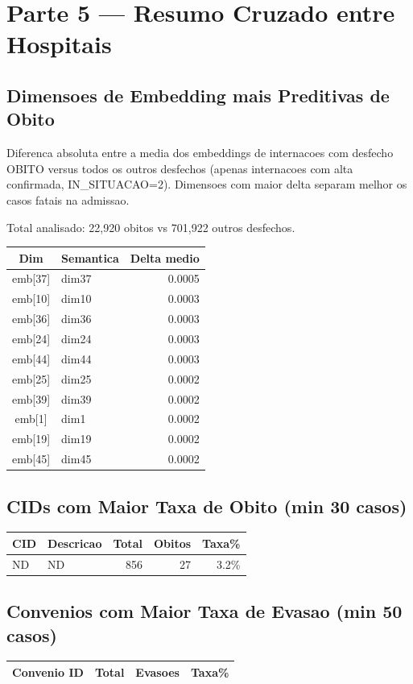 \documentclass[11pt,a4paper]{article}
\begin{document}
\section{Parte 5 --- Resumo Cruzado entre Hospitais}
\subsection{Dimensoes de Embedding mais Preditivas de Obito}
Diferenca absoluta entre a media dos embeddings de internacoes com desfecho OBITO versus todos os outros desfechos (apenas internacoes com alta confirmada, IN\_SITUACAO=2). Dimensoes com maior delta separam melhor os casos fatais na admissao.

Total analisado: 22,920 obitos vs 701,922 outros desfechos.

\begin{tabular}{clr}
\toprule
Dim & Semantica & Delta medio \\
\midrule
emb[37] & dim37 & 0.0005 \\
emb[10] & dim10 & 0.0003 \\
emb[36] & dim36 & 0.0003 \\
emb[24] & dim24 & 0.0003 \\
emb[44] & dim44 & 0.0003 \\
emb[25] & dim25 & 0.0002 \\
emb[39] & dim39 & 0.0002 \\
emb[1] & dim1 & 0.0002 \\
emb[19] & dim19 & 0.0002 \\
emb[45] & dim45 & 0.0002 \\
\bottomrule
\end{tabular}

\subsection{CIDs com Maior Taxa de Obito (min 30 casos)}

\begin{longtable}{llrrr}
\toprule
CID & Descricao & Total & Obitos & Taxa\% \\
\midrule
\endhead
\rowcolor{yellow!10}ND & ND & 856 & 27 & 3.2\% \\
\bottomrule
\end{longtable}
\subsection{Convenios com Maior Taxa de Evasao (min 50 casos)}

\begin{tabular}{lrrr}
\toprule
Convenio ID & Total & Evasoes & Taxa\% \\
\midrule
\bottomrule
\end{tabular}
\end{document}
